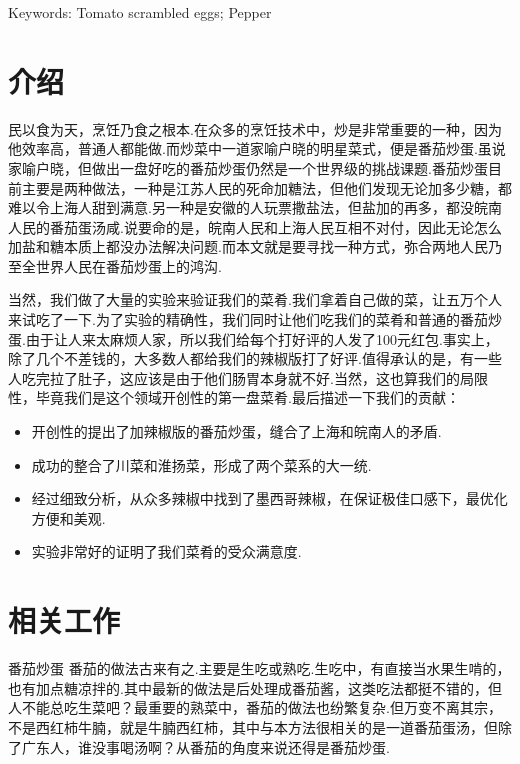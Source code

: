 \vspace{1em}\noindent
{}\hei Keywords:
\songti \rm Tomato scrambled eggs; Pepper

\newpage



\section{介绍}
民以食为天，烹饪乃食之根本.在众多的烹饪技术中，炒是非常重要的一种，因为他效率高，普通人都能做.而炒菜中一道家喻户晓的明星菜式，便是番茄炒蛋.虽说家喻户晓，但做出一盘好吃的番茄炒蛋仍然是一个世界级的挑战课题.番茄炒蛋目前主要是两种做法，一种是江苏人民的死命加糖法，但他们发现无论加多少糖，都难以令上海人甜到满意.另一种是安徽的人玩票撒盐法，但盐加的再多，都没皖南人民的番茄蛋汤咸.说要命的是，皖南人民和上海人民互相不对付，因此无论怎么加盐和糖本质上都没办法解决问题.而本文就是要寻找一种方式，弥合两地人民乃至全世界人民在番茄炒蛋上的鸿沟.

当然，我们做了大量的实验来验证我们的菜肴.我们拿着自己做的菜，让五万个人来试吃了一下.为了实验的精确性，我们同时让他们吃我们的菜肴和普通的番茄炒蛋.由于让人来太麻烦人家，所以我们给每个打好评的人发了100元红包.事实上，除了几个不差钱的，大多数人都给我们的辣椒版打了好评.值得承认的是，有一些人吃完拉了肚子，这应该是由于他们肠胃本身就不好.当然，这也算我们的局限性，毕竟我们是这个领域开创性的第一盘菜肴.最后描述一下我们的贡献：
\begin{itemize}[leftmargin=*,noitemsep]
    \item 开创性的提出了加辣椒版的番茄炒蛋，缝合了上海和皖南人的矛盾.
    \item 成功的整合了川菜和淮扬菜，形成了两个菜系的大一统.
    \item 经过细致分析，从众多辣椒中找到了墨西哥辣椒，在保证极佳口感下，最优化方便和美观.
    \item 实验非常好的证明了我们菜肴的受众满意度.
\end{itemize}




\newpage
\section{相关工作}
番茄炒蛋 番茄的做法古来有之.主要是生吃或熟吃.生吃中，有直接当水果生啃的\cite{example2022}，也有加点糖凉拌的\cite{example2022}.其中最新的做法是后处理成番茄酱\cite{example2022}，这类吃法都挺不错的，但人不能总吃生菜吧？最重要的熟菜中，番茄的做法也纷繁复杂.但万变不离其宗，不是西红柿牛腩，就是牛腩西红柿，其中与本方法很相关的是一道番茄蛋汤，但除了广东人，谁没事喝汤啊？从番茄的角度来说还得是番茄炒蛋.

